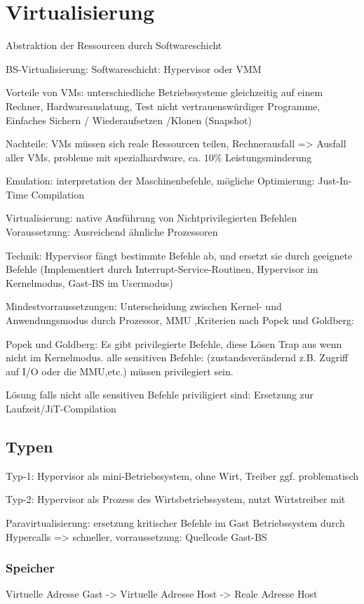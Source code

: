 \section*{Virtualisierung}
Abstraktion der Ressourcen durch Softwareschicht

BS-Virtualisierung: Softwareschicht: Hypervisor oder VMM

Vorteile von VMs: unterschiedliche Betriebssysteme gleichzeitig auf einem Rechner, Hardwareauslatung, Test nicht vertrauenswürdiger Programme, Einfaches Sichern / Wiederaufsetzen /Klonen (Snapshot)

Nachteile: VMs müssen sich reale Ressourcen teilen, Rechnerausfall =>  Ausfall aller VMs, probleme mit spezialhardware, ca. 10\% Leistungsminderung


Emulation: interpretation der Maschinenbefehle, mögliche Optimierung: Just-In-Time Compilation

Virtualisierung: native Ausführung von Nichtprivilegierten Befehlen
Voraussetzung: Ausreichend ähnliche Prozessoren

Technik: Hypervisor fängt bestimmte Befehle ab, und ersetzt sie durch geeignete Befehle 
(Implementiert durch Interrupt-Service-Routinen, Hypervisor im Kernelmodus, Gast-BS im Usermodus)


Mindestvorraussetzungen: Unterscheidung zwischen Kernel- und Anwendungsmodus durch 
Prozessor, MMU ,Kriterien nach Popek und Goldberg:

Popek und Goldberg: Es gibt privilegierte Befehle, diese Lösen Trap aus wenn nicht im Kernelmodus. alle sensitiven Befehle: (zustandsverändernd z.B. Zugriff auf I/O oder die MMU,etc.) müssen privilegiert sein.

Lösung falls nicht alle sensitiven Befehle priviligiert sind: Ersetzung zur Laufzeit/JiT-Compilation

\subsection*{Typen}
Typ-1: Hypervisor als mini-Betriebssystem, ohne Wirt, Treiber ggf. problematisch

Typ-2: Hypervisor als Prozess des Wirtsbetriebssystem, nutzt Wirtstreiber mit

Paravirtualisierung: ersetzung kritischer Befehle im Gast Betriebssystem durch Hypercalls 
=> schneller, vorraussetzung: Quellcode Gast-BS

\subsubsection*{Speicher}
Virtuelle Adresse Gast -> Virtuelle Adresse Host -> Reale Adresse Host


